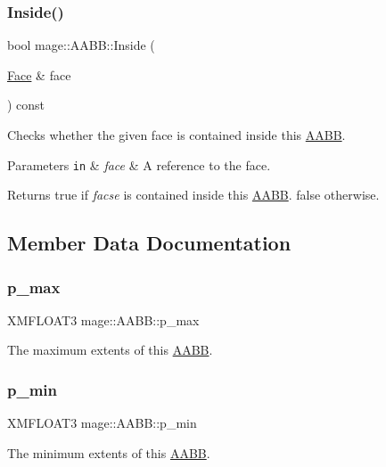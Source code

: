 \subsubsection{\texorpdfstring{Inside()}{Inside()}\hspace{0.1cm}{\footnotesize\ttfamily [2/2]}}
{\footnotesize\ttfamily bool mage\+::\+A\+A\+B\+B\+::\+Inside (\begin{DoxyParamCaption}\item[{\hyperlink{structmage_1_1_face}{Face} \&}]{face }\end{DoxyParamCaption}) const}

Checks whether the given face is contained inside this \hyperlink{structmage_1_1_a_a_b_b}{A\+A\+BB}.


\begin{DoxyParams}[1]{Parameters}
\mbox{\tt in}  & {\em face} & A reference to the face. \\
\hline
\end{DoxyParams}
\begin{DoxyReturn}{Returns}
{\ttfamily true} if {\itshape facse} is contained inside this \hyperlink{structmage_1_1_a_a_b_b}{A\+A\+BB}. {\ttfamily false} otherwise. 
\end{DoxyReturn}


\subsection{Member Data Documentation}
\hypertarget{structmage_1_1_a_a_b_b_aa5c60af6413a01158acd81d67ebe828c}{}\label{structmage_1_1_a_a_b_b_aa5c60af6413a01158acd81d67ebe828c} 
\subsubsection{\texorpdfstring{p\+\_\+max}{p\_max}}
{\footnotesize\ttfamily X\+M\+F\+L\+O\+A\+T3 mage\+::\+A\+A\+B\+B\+::p\+\_\+max}

The maximum extents of this \hyperlink{structmage_1_1_a_a_b_b}{A\+A\+BB}. \hypertarget{structmage_1_1_a_a_b_b_aca78eb314738b73f2d21dcf75130b6eb}{}\label{structmage_1_1_a_a_b_b_aca78eb314738b73f2d21dcf75130b6eb} 
\subsubsection{\texorpdfstring{p\+\_\+min}{p\_min}}
{\footnotesize\ttfamily X\+M\+F\+L\+O\+A\+T3 mage\+::\+A\+A\+B\+B\+::p\+\_\+min}

The minimum extents of this \hyperlink{structmage_1_1_a_a_b_b}{A\+A\+BB}. 